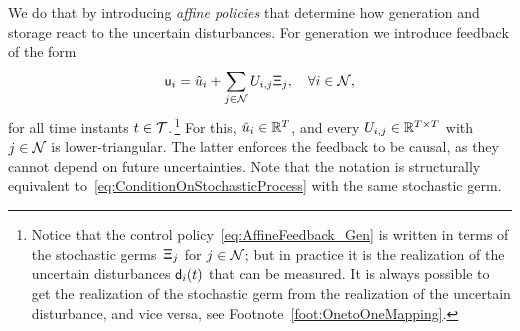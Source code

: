 \documentclass[final,3p,times,twocolumn]{elsarticle}  %
\begin{document}
We do that by introducing \textit{affine policies} that determine how generation and storage react to the uncertain disturbances. For generation we introduce feedback of the form
\begin{subequations}
\label{eq:GenerationPolicy}
\begin{align}
\label{eq:AffineFeedback_Gen}
\rv\gen_i
= \hat{\gen}_i + \sum_{j \in \mathcal{\nbus}} \Gen_{i,j} \rv\Xi_j, \quad \forall i \in \mathcal{\nbus},
\end{align}
\end{subequations}
for all time instants $t \in \mathcal{T}$.\,\footnote{Notice that the control policy~\eqref{eq:AffineFeedback_Gen} is written in terms of the stochastic germs~$\mathsf{\Xi}_j$ for $j \in \mathcal{N}$;
but in practice it is the realization of the uncertain disturbances $\mathsf{d}_i(t)$ that can be measured.
It is always possible to get the realization of the stochastic germ from the realization of the uncertain disturbance, and vice versa, see Footnote~\ref{foot:OnetoOneMapping}.\label{foot:Rewriting}}
%
For this, $\hat{u}_i \in \mathbb{R}^{T}$, and every $\Gen_{i,j} \in \mathbb{R}^{\horizon \times \horizon}$ with $j \in \mathcal{N}$ is lower-triangular. 
The latter enforces the feedback to be causal, as they cannot depend on future uncertainties.
Note that the notation is structurally equivalent to~\eqref{eq:ConditionOnStochasticProcess} with the same stochastic germ.
\end{document}
